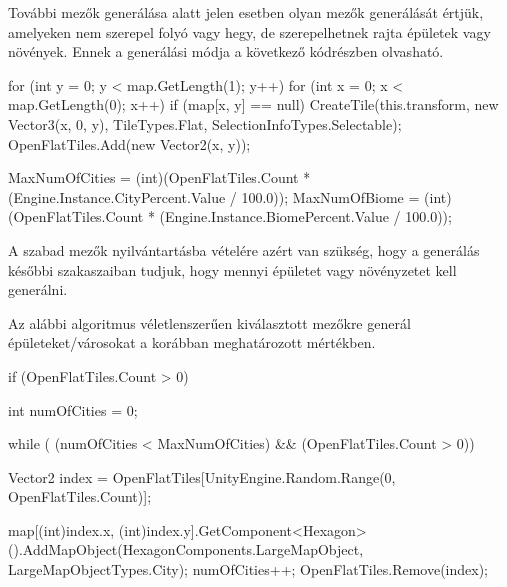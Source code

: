 
További mezők generálása alatt jelen esetben olyan mezők generálását értjük, amelyeken nem szerepel folyó vagy hegy, de szerepelhetnek rajta épületek vagy növények. Ennek a generálási módja a következő kódrészben olvasható.
\begin{cpp}
for (int y = 0; y < map.GetLength(1); y++)
{
   for (int x = 0; x < map.GetLength(0); x++)
   {
      if (map[x, y] == null)
      {
         CreateTile(this.transform, new Vector3(x, 0, y),
         TileTypes.Flat, SelectionInfoTypes.Selectable);
         OpenFlatTiles.Add(new Vector2(x, y));
      }
   }
}

MaxNumOfCities = (int)(OpenFlatTiles.Count * 
(Engine.Instance.CityPercent.Value / 100.0));
MaxNumOfBiome = (int)(OpenFlatTiles.Count * 
(Engine.Instance.BiomePercent.Value / 100.0));
\end{cpp}

A szabad mezők nyilvántartásba vételére azért van szükség, hogy a generálás későbbi szakaszaiban tudjuk, hogy mennyi épületet vagy növényzetet kell generálni.


Az alábbi algoritmus véletlenszerűen kiválasztott mezőkre generál épületeket/városokat a korábban meghatározott mértékben.
\begin{cpp}
if (OpenFlatTiles.Count > 0)
{
   int numOfCities = 0;
    
   while ( (numOfCities < MaxNumOfCities) && (OpenFlatTiles.Count > 0))
   {
      Vector2 index = OpenFlatTiles[UnityEngine.Random.Range(0, 
      OpenFlatTiles.Count)];

      map[(int)index.x, (int)index.y].GetComponent<Hexagon>
      ().AddMapObject(HexagonComponents.LargeMapObject, 
      LargeMapObjectTypes.City);
      numOfCities++;
      OpenFlatTiles.Remove(index);
   }
}
\end{cpp}


